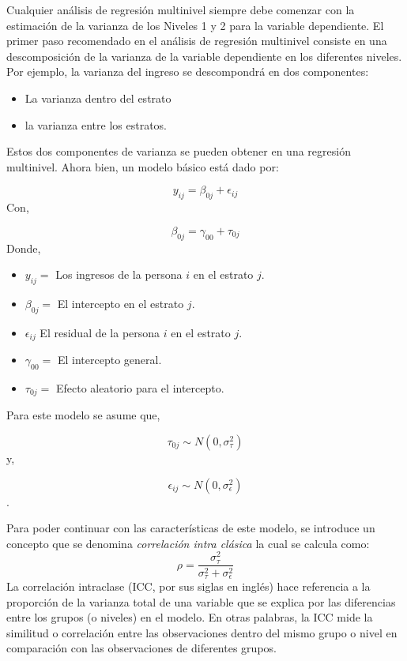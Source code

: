 \documentclass[
  spanish,
  12pt,
]{book}
\providecommand{\tightlist}{%
  \setlength{\itemsep}{0pt}\setlength{\parskip}{0pt}}
\begin{document}
Cualquier análisis de regresión multinivel siempre debe comenzar con la estimación de la varianza de los Niveles 1 y 2 para la variable dependiente. El primer paso recomendado en el análisis de regresión multinivel consiste en una descomposición de la varianza de la variable dependiente en los diferentes niveles. Por ejemplo, la varianza del ingreso se descompondrá en dos componentes:

\begin{itemize}
\tightlist
\item
  La varianza dentro del estrato
\item
  la varianza entre los estratos.
\end{itemize}

Estos dos componentes de varianza se pueden obtener en una regresión multinivel. Ahora bien, un modelo básico está dado por:

\[
y_{ij}=\beta_{0j}+\epsilon_{ij}
\]
Con,

\[
\beta_{0j}=\gamma_{00}+\tau_{0j}
\]
Donde,

\begin{itemize}
\tightlist
\item
  \(y_{ij}=\) Los ingresos de la persona \(i\) en el estrato \(j\).
\item
  \(\beta_{0j}=\) El intercepto en el estrato \(j\).
\item
  \(\epsilon_{ij}\) El residual de la persona \(i\) en el estrato \(j\).
\item
  \(\gamma_{00}=\) El intercepto general.
\item
  \(\tau_{0j}=\) Efecto aleatorio para el intercepto.
\end{itemize}

Para este modelo se asume que,

\[
\tau_{0j}\sim N\left(0,\sigma_{\tau}^{2}\right)
\]
y,

\[
\epsilon_{ij}\sim N\left(0,\sigma_{\epsilon}^{2}\right)
\].

Para poder continuar con las características de este modelo, se introduce un concepto que se denomina \emph{correlación intra clásica} la cual se calcula como:
\[
\rho=\frac{\sigma_{\tau}^{2}}{\sigma_{\tau}^{2}+\sigma_{\epsilon}^{2}}
\]
La correlación intraclase (ICC, por sus siglas en inglés) hace referencia a la proporción de la varianza total de una variable que se explica por las diferencias entre los grupos (o niveles) en el modelo. En otras palabras, la ICC mide la similitud o correlación entre las observaciones dentro del mismo grupo o nivel en comparación con las observaciones de diferentes grupos.
\end{document}
